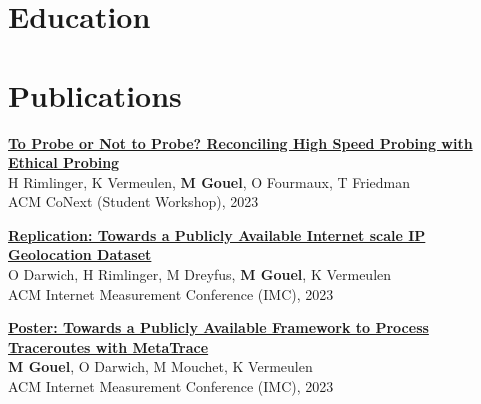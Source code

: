 \documentclass[11pt,a4paper,sans]{moderncv} %
\begin{document}

\section{Education}



\section{Publications}

\href{https://dl.acm.org/doi/abs/10.1145/3630202.3630232}{\textbf{To Probe or Not to Probe? Reconciling High Speed Probing with Ethical Probing}}\\
H Rimlinger, K Vermeulen, \textbf{M Gouel}, O Fourmaux, T Friedman\\
ACM CoNext (Student Workshop), 2023

\vspace{0.25cm}
\href{https://hal.science/hal-04215113/document}{\textbf{Replication: Towards a Publicly Available Internet scale IP Geolocation Dataset}}\\
O Darwich, H Rimlinger, M Dreyfus, \textbf{M Gouel}, K Vermeulen\\
ACM Internet Measurement Conference (IMC), 2023

\vspace{0.25cm}
\href{https://hal.science/hal-04218315v1/document}{\textbf{Poster: Towards a Publicly Available Framework to Process Traceroutes with MetaTrace}}\\
\textbf{M Gouel}, O Darwich, M Mouchet, K Vermeulen\\
ACM Internet Measurement Conference (IMC), 2023
\end{document}
